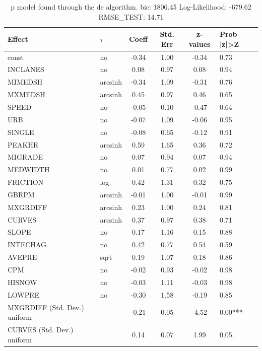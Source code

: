\begin{table}
	\caption{p model found through the de algorithm. bic: 1806.45 Log-Likelihood: -679.62 RMSE_TEST: 14.71}
	\begin{center}
		\begin{tabular}{|l|l|c|c|c|l|}
			\hline
			Effect & $\tau$ & Coeff & Std. Err & z-values & Prob |z|>Z \\
			\hline
			const & no & -0.34 & 1.00 & -0.34 & 0.73 \\
			\hline
			INCLANES & no & 0.08 & 0.97 & 0.08 & 0.94 \\
			\hline
			MIMEDSH & arcsinh & -0.34 & 1.09 & -0.31 & 0.76 \\
			\hline
			MXMEDSH & arcsinh & 0.45 & 0.97 & 0.46 & 0.65 \\
			\hline
			SPEED & no & -0.05 & 0.10 & -0.47 & 0.64 \\
			\hline
			URB & no & -0.07 & 1.09 & -0.06 & 0.95 \\
			\hline
			SINGLE & no & -0.08 & 0.65 & -0.12 & 0.91 \\
			\hline
			PEAKHR & arcsinh & 0.59 & 1.65 & 0.36 & 0.72 \\
			\hline
			MIGRADE & no & 0.07 & 0.94 & 0.07 & 0.94 \\
			\hline
			MEDWIDTH & no & 0.01 & 0.77 & 0.02 & 0.99 \\
			\hline
			FRICTION & log & 0.42 & 1.31 & 0.32 & 0.75 \\
			\hline
			GBRPM & arcsinh & -0.01 & 1.00 & -0.01 & 0.99 \\
			\hline
			MXGRDIFF & arcsinh & 0.23 & 1.00 & 0.24 & 0.81 \\
			\hline
			CURVES & arcsinh & 0.37 & 0.97 & 0.38 & 0.71 \\
			\hline
			SLOPE & no & 0.17 & 1.16 & 0.15 & 0.88 \\
			\hline
			INTECHAG & no & 0.42 & 0.77 & 0.54 & 0.59 \\
			\hline
			AVEPRE & sqrt & 0.19 & 1.07 & 0.18 & 0.86 \\
			\hline
			CPM & no & -0.02 & 0.93 & -0.02 & 0.98 \\
			\hline
			HISNOW & no & -0.03 & 1.11 & -0.03 & 0.98 \\
			\hline
			LOWPRE & no & -0.30 & 1.58 & -0.19 & 0.85 \\
			\hline
			MXGRDIFF (Std. Dev.) uniform &  & -0.21 & 0.05 & -4.52 & 0.00*** \\
			\hline
			CURVES (Std. Dev.) uniform &  & 0.14 & 0.07 & 1.99 & 0.05. \\

\end{tabular}
\end{center}
\end{table}

